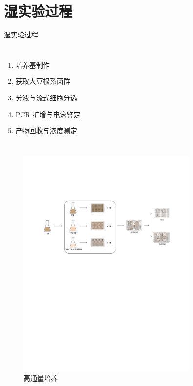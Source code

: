 \documentclass[UTF8]{ctexbeamer}
\begin{document}
	\section{湿实验过程}
	\begin{frame}{湿实验过程}
		\vspace{0.5cm}
		\begin{columns}
			\begin{enumerate}
				\item 培养基制作
				\item 获取大豆根系菌群
				\item 分液与流式细胞分选
				\item PCR 扩增与电泳鉴定
				\item 产物回收与浓度测定
			\end{enumerate}

		
		\end{columns}

		\begin{figure}
			\centering
			\includegraphics[width=0.8\textwidth]{img/CulturePipeline.pdf}
			\caption{高通量培养}
		\end{figure}
	\end{frame}
\end{document}
